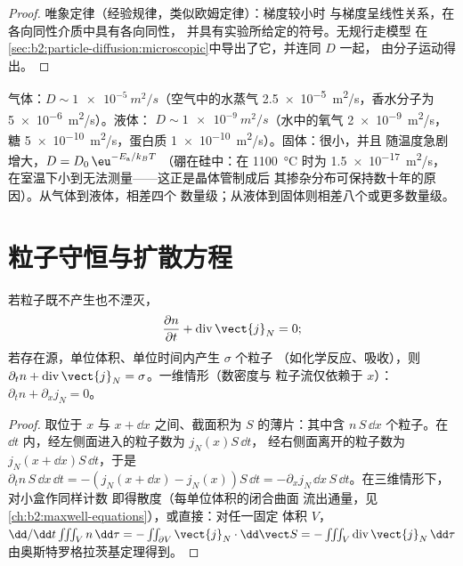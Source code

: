 \begin{proof}
唯象定律（经验规律，类似欧姆定律）：梯度较小时
与梯度呈线性关系，在各向同性介质中具有各向同性，
并具有实验所给定的符号。无规行走模型
在\cref{sec:b2:particle-diffusion:microscopic}中导出了它，并连同 $D$ 一起，
由分子运动得出。
\end{proof}

\begin{example}[$D$ 的数量级]\label{ex:b2:particle-diffusion:orders}
气体：$D \sim \qty{1e-5}{m^2/s}$（空气中的水蒸气
\qty{2.5e-5}{m^2/s}，香水分子为 \qty{5e-6}{m^2/s}）。液体：
$D \sim \qty{1e-9}{m^2/s}$（水中的氧气 \qty{2e-9}{m^2/s}，糖
\qty{5e-10}{m^2/s}，蛋白质 \qty{1e-10}{m^2/s}）。固体：很小，并且
随温度急剧增大，$D = D_0\,\eu^{-E_{\text{a}}/k_BT}$
（硼在硅中：在 \qty{1100}{\celsius} 时为 \qty{1.5e-17}{m^2/s}，
在室温下小到无法测量——这正是晶体管制成后
其掺杂分布可保持数十年的原因）。从气体到液体，相差四个
数量级；从液体到固体则相差八个或更多数量级。
\end{example}

\section{粒子守恒与扩散方程}

\begin{theorem}[局域粒子数守恒]\label{thm:b2:particle-diffusion:balance}
若粒子既不产生也不湮灭，
\[
\frac{\partial n}{\partial t} + \operatorname{div}\vect{j}_N = 0 ;
\]
若存在源，单位体积、单位时间内产生 $\sigma$ 个粒子
（如化学反应、吸收），则 $\partial_t n +
\operatorname{div}\vect{j}_N = \sigma$。一维情形（数密度与
粒子流仅依赖于 $x$）：$\partial_t n + \partial_x j_N = 0$。
\end{theorem}

\begin{proof}
取位于 $x$ 与 $x + \dd x$ 之间、截面积为 $S$ 的薄片：其中含
$n\,S\,\dd x$ 个粒子。在 $\dd t$ 内，经左侧面进入的粒子数为 $j_N(x)S\,\dd t$，
经右侧面离开的粒子数为 $j_N(x + \dd x)S\,\dd t$，于是
$\partial_t n\,S\,\dd x\,\dd t = -(j_N(x+\dd x) - j_N(x))S\,\dd t =
-\partial_x j_N\,\dd x\,S\,\dd t$。在三维情形下，对小盒作同样计数
即得散度（每单位体积的闭合曲面
流出通量，见\cref{ch:b2:maxwell-equations}），或直接：对任一固定
体积 $V$，$\dd/\dd t \iiint_V n\,\dd\tau = -\iint_{\partial V}
\vect{j}_N\cdot\dd\vect S = -\iiint_V \operatorname{div}\vect{j}_N\,\dd\tau$
由奥斯特罗格拉茨基定理得到。
\end{proof}

